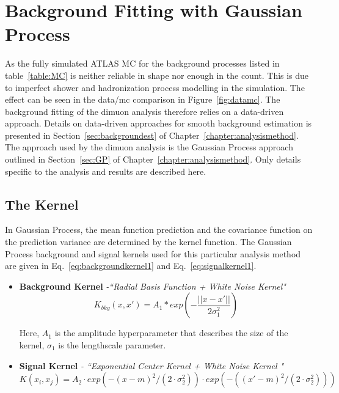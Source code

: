 \section{Background Fitting with Gaussian Process}
\label{sec:GPresults}

As the fully simulated ATLAS MC for the background processes listed in table~\ref{table:MC} is neither reliable in shape nor enough in the count. This is due to imperfect shower and hadronization process modelling in the simulation. The effect can be seen in the data/mc comparison in Figure~\ref{fig:datamc}.  The background fitting of the dimuon analysis therefore relies on a data-driven approach. Details on data-driven approaches for smooth background estimation is presented in Section~\ref{sec:backgroundest} of Chapter~\ref{chapter:analysismethod}. The approach used by the dimuon analysis is the Gaussian Process approach outlined in
Section~\ref{sec:GP} of Chapter~\ref{chapter:analysismethod}. Only details specific to the analysis and results are described here.

\subsection{The Kernel}
In Gaussian Process, the mean function prediction and the covariance function on the prediction variance are determined by the kernel function.
The Gaussian Process background and signal kernels used for this particular analysis method are given in Eq.~\ref{eq:backgroundkernel1} and Eq.~\ref{eq:signalkernel1}. 

\begin{itemize}
    \item \textbf{Background Kernel} \textit{-``Radial Basis Function + White Noise Kernel"}
        \begin{equation}
                K_{bkg}(x, x') = A_{1} * exp(-\frac{||x-x'||}{2\sigma_{1}^{2}}) 
        \label{eq:backgroundkernel1}
        \end{equation}

    Here, $A_{1}$ is the amplitude hyperparameter that describes the size of the kernel, $\sigma_{1}$ is the lengthscale parameter.
\item \textbf{Signal Kernel} \textit{- ``Exponential Center Kernel + White Noise Kernel "}
            \begin{equation}
            K(x_{i}, x_{j})=A_{2}\cdot exp(-(x-m)^{2}/(2\cdot\sigma_{2}^{2}))\cdot exp(-((x'-m)^{2}/(2\cdot\sigma_{2}^{2})))
            \label{eq:signalkernel1}
            \end{equation}
\end{itemize}

